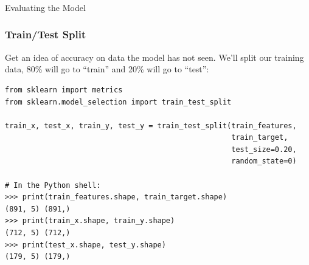 



\begin{frame}[fragile]\frametitle{}
\begin{center}
{\Large Evaluating the Model}
\end{center}
\end{frame}

\begin{frame}[fragile]\frametitle{Train/Test Split}
Get an idea of accuracy on data the model has not seen.
We'll split our training data, 80\% will go to ``train'' and 20\% will go to ``test'':
\begin{lstlisting}
from sklearn import metrics
from sklearn.model_selection import train_test_split

train_x, test_x, train_y, test_y = train_test_split(train_features,
                                                    train_target,
                                                    test_size=0.20,
                                                    random_state=0)

# In the Python shell:
>>> print(train_features.shape, train_target.shape)
(891, 5) (891,)
>>> print(train_x.shape, train_y.shape)
(712, 5) (712,)
>>> print(test_x.shape, test_y.shape)
(179, 5) (179,)
\end{lstlisting}
\end{frame}

